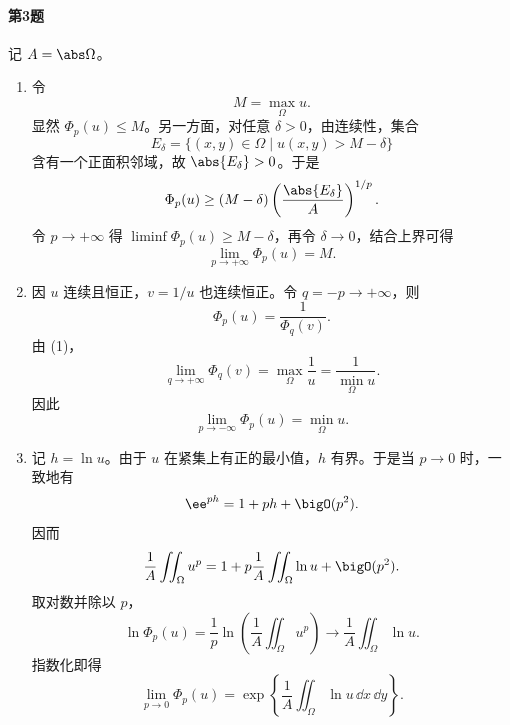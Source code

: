 \paragraph{第3题}
\begin{xsolution}
记 $A=\abs\Omega$。
\begin{enumerate}[label=(\arabic*)]
  \item 令
  \[
    M=\max_\Omega u.
  \]
  显然 $\Phi_p(u)\le M$。另一方面，对任意 $\delta>0$，由连续性，集合
  \[
    E_\delta=\{(x,y)\in\Omega\mid u(x,y)>M-\delta\}
  \]
  含有一个正面积邻域，故 $\abs{E_\delta}>0$。于是
  \[
    \Phi_p(u)
    \ge(M-\delta)
    \left(\frac{\abs{E_\delta}}A\right)^{1/p}.
  \]
  令 $p\to+\infty$ 得 $\liminf\Phi_p(u)\ge M-\delta$，再令 $\delta\to0$，结合上界可得
  \[
    \boxed{\lim_{p\to+\infty}\Phi_p(u)=M}.
  \]

  \item 因 $u$ 连续且恒正，$v=1/u$ 也连续恒正。令 $q=-p\to+\infty$，则
  \[
    \Phi_p(u)=\frac1{\Phi_q(v)}.
  \]
  由 (1)，
  \[
    \lim_{q\to+\infty}\Phi_q(v)=\max_\Omega\frac1u
    =\frac1{\min_\Omega u}.
  \]
  因此
  \[
    \boxed{\lim_{p\to-\infty}\Phi_p(u)=\min_\Omega u}.
  \]

  \item 记 $h=\ln u$。由于 $u$ 在紧集上有正的最小值，$h$ 有界。于是当 $p\to0$ 时，一致地有
  \[
    \ee^{ph}=1+ph+\bigO(p^2).
  \]
  因而
  \[
    \frac1A\iint_\Omega u^p
    =1+p\frac1A\iint_\Omega\ln u+\bigO(p^2).
  \]
  取对数并除以 $p$，
  \[
    \ln\Phi_p(u)
    =\frac1p\ln\left(\frac1A\iint_\Omega u^p\right)
    \longrightarrow\frac1A\iint_\Omega\ln u.
  \]
  指数化即得
  \[
    \boxed{\lim_{p\to0}\Phi_p(u)
    =\exp\left\{\frac1A\iint_\Omega\ln u\,\dd x\,\dd y\right\}}.
  \]
\end{enumerate}
\end{xsolution}

